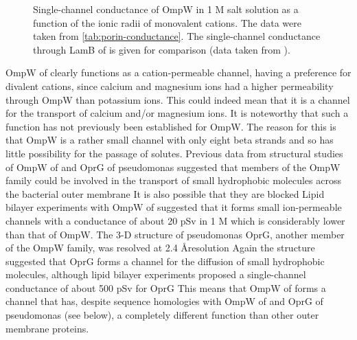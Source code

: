 \begin{figure}[htb]
  	\begin{center}
   	\end{center}
   	\caption[Single-channel conductance of OmpW in 1 M salt solution as a function of the ionic radii of monovalent cations]{
Single-channel conductance of OmpW in 1 M salt solution as a function of the ionic radii of monovalent cations. 
The data were taken from \cref{tab:porin-conductance}. The single-channel conductance through LamB of \ecoli is given for comparison (data taken from ).
   	}
   	\label{fig:porin-ionicradii}
\end{figure}   

OmpW of \caulobacter clearly functions as a cation-permeable channel, having a preference for divalent cations, since calcium and magnesium ions had a higher permeability through OmpW than potassium ions. This could indeed mean that it is a channel for the transport of calcium and/or magnesium ions. It is noteworthy that such a function has not previously been established for OmpW. The reason for this is that OmpW is a rather small channel with only eight beta strands and so has little possibility for the passage of solutes. Previous data from structural studies of OmpW of \ecoli and OprG of \ac{pseudomonas} suggested that members of the OmpW family could be involved in the transport of small hydrophobic molecules across the bacterial outer membrane It is also possible that they are blocked Lipid bilayer experiments with OmpW of \ecoli suggested that it forms small ion-permeable channels with a conductance of about 20 \si{\pico\sievert} in 1 M  which is considerably lower than that of \caulobacter OmpW. The 3-D structure of \ac{pseudomonas} OprG, another member of the OmpW family, was resolved at 2.4 \AA resolution Again the structure suggested that OprG forms a channel for the diffusion of small hydrophobic molecules, although lipid bilayer experiments proposed a single-channel conductance of about 500 \si{\pico\sievert} for OprG This means that OmpW of \caulobacter forms a channel that has, despite sequence homologies with OmpW of \ecoli and OprG of \ac{pseudomonas} (see below), a completely different function than other outer membrane proteins.

